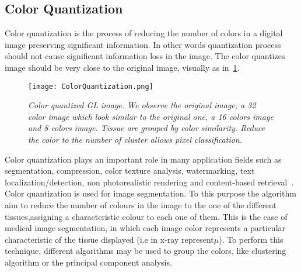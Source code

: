 \documentclass{standalone}
\begin{document}
	\subsection{Color Quantization}
	

	Color quantization is the process of reducing the number of colors in a digital image preserving significant information. In other words quantization process should not cause significant information loss in the image.  The color quantizes image should be very close to the original image, visually as in \figurename\,\ref{fig:ColorQuantization}. 

	\begin{figure}[h!]
		
		\centering
			\texttt{[image: ColorQuantization.png]}
		\caption{\textit{Color quantized GL image. We observe the original image, a 32 color image which look similar to the original one, a 16 colors image and 8 colors image. Tissue are grouped by color similarity. Reduce the color to the number of cluster allows pixel classification. }}\label{fig:ColorQuantization}
	\end{figure}

	Color quantization plays an important role in many application fields such as segmentation, compression, color texture analysis, watermarking, 
	text localization/detection, non photorealistic rendering and content-based retrieval~\cite{ART:Ozturk}.\\
	
	
	Color quantization is used for image segmentation. To this purpose the algorithm aim to reduce the number of colours in the image to the one of the different tissues,assigning a characteristic colour to each one of them. This is the case of medical image segmentation, in which each image color represents a particular characteristic of the tissue displayed (i.e in x-ray represent$\mu$). 
	To perform this technique, different algorithms may be used to group the colors, like clustering algorithm or the principal component analysis.


	
	
	
	

	
	
\end{document}
